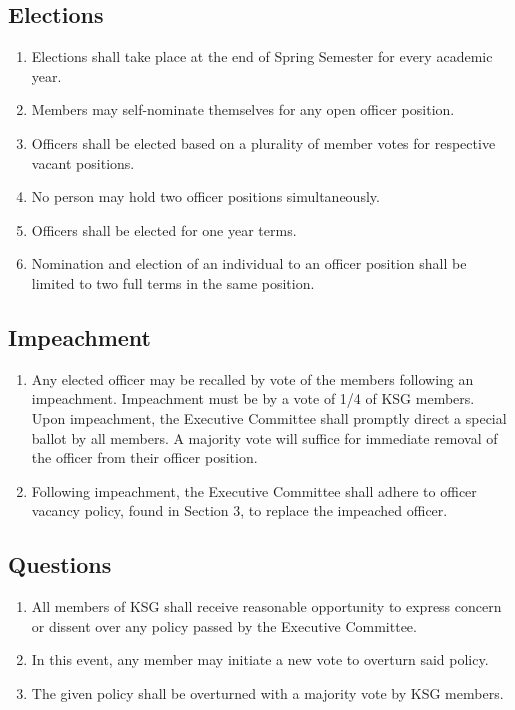 \documentclass[12pt,executivepaper]{article}
\begin{document}
\subsection{Elections}
\begin{enumerate}
    \item Elections shall take place at the end of Spring Semester for every
          academic year.
    \item Members may self-nominate themselves for any open officer position.
    \item Officers shall be elected based on a plurality of member votes for
          respective vacant positions.
    \item No person may hold two officer positions simultaneously.
    \item Officers shall be elected for one year terms.
    \item Nomination and election of an individual to an officer position shall
          be limited to two full terms in the same position.
\end{enumerate}

\subsection{Impeachment}
\begin{enumerate}
    \item Any elected officer may be recalled by vote of the members following an
          impeachment. Impeachment must be by a vote of 1/4 of KSG members.
          Upon impeachment, the Executive Committee shall promptly direct a special
          ballot by all members. A majority vote will suffice for immediate removal
          of the officer from their officer position.
    \item Following impeachment, the Executive Committee shall adhere to
          officer vacancy policy, found in Section 3, to replace the impeached
          officer.
\end{enumerate}

\subsection{Questions}
\begin{enumerate}
    \item All members of KSG shall receive reasonable opportunity to express
          concern or dissent over any policy passed by the Executive Committee.
    \item In this event, any member may initiate a new vote to overturn said
          policy.
    \item The given policy shall be overturned with a majority vote by KSG
          members.
\end{enumerate}
\end{document}
